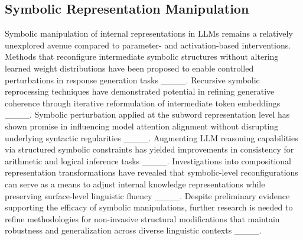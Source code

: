 \subsection{Symbolic Representation Manipulation}

Symbolic manipulation of internal representations in LLMs remains a relatively unexplored avenue compared to parameter- and activation-based interventions. Methods that reconfigure intermediate symbolic structures without altering learned weight distributions have been proposed to enable controlled perturbations in response generation tasks ____. Recursive symbolic reprocessing techniques have demonstrated potential in refining generative coherence through iterative reformulation of intermediate token embeddings ____. Symbolic perturbation applied at the subword representation level has shown promise in influencing model attention alignment without disrupting underlying syntactic regularities ____. Augmenting LLM reasoning capabilities via structured symbolic constraints has yielded improvements in consistency for arithmetic and logical inference tasks ____. Investigations into compositional representation transformations have revealed that symbolic-level reconfigurations can serve as a means to adjust internal knowledge representations while preserving surface-level linguistic fluency ____. Despite preliminary evidence supporting the efficacy of symbolic manipulations, further research is needed to refine methodologies for non-invasive structural modifications that maintain robustness and generalization across diverse linguistic contexts ____.